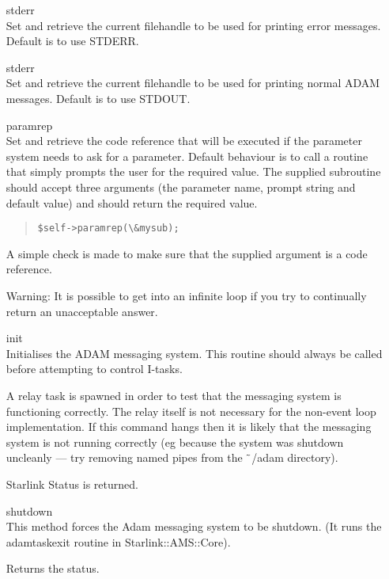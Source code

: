 \documentclass[twoside,11pt]{article}
\newenvironment{myquote}{\begin{quote}\begin{small}}{\end{small}\end{quote}}
\renewcommand{\_}{\texttt{\symbol{95}}}
\begin{document}
\begin{itemize}
\item[stderr]%
%
\hfil\\
Set and retrieve the current filehandle to be used for printing
error messages. Default is to use STDERR.

\item[stderr]%
%
\hfil\\
Set and retrieve the current filehandle to be used for printing
normal ADAM messages. Default is to use STDOUT.

\item[paramrep]%
%
\hfil\\
Set and retrieve the code reference that will be executed if
the parameter system needs to ask for a parameter.
Default behaviour is to call a routine that simply prompts
the user for the required value. The supplied subroutine
should accept three arguments (the parameter name, prompt string and
default value) and should return the required value.
\begin{myquote}
\begin{verbatim}
$self->paramrep(\&mysub);
\end{verbatim}
\end{myquote}

A simple check is made to make sure that the supplied argument
is a code reference.

Warning: It is possible to get into an infinite loop if you try
to continually return an unacceptable answer.

\item[init]%
%
\hfil\\
Initialises the ADAM messaging system. This routine should always be
called before attempting to control I-tasks.

A relay task is spawned in order to test that the messaging system
is functioning correctly. The relay itself is not necessary for the
non-event loop implementation. If this command hangs then it is
likely that the messaging system is not running correctly (eg
because the system was shutdown uncleanly --- try removing named pipes
from the $\tilde{\hspace{0.4em}}$/adam directory).

Starlink Status is returned.

\item[shutdown]%
%
\hfil\\
This method forces the Adam messaging system to be shutdown.
(It runs the adamtask\_exit routine in Starlink::AMS::Core).

Returns the status.

\end{itemize}
\end{document}
